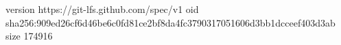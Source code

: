 version https://git-lfs.github.com/spec/v1
oid sha256:909ed26cf6d46be6c0fd81ce2bf8da4fc3790317051606d3bb1dcceef403d3ab
size 174916
